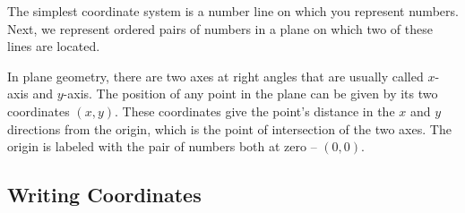 The simplest coordinate system is a number line on which you represent numbers.
Next, we represent ordered pairs of numbers in a plane on which two of these
lines are located.

In plane geometry, there are two axes at right angles that are usually called
$x$-axis and $y$-axis. The position of any point in the plane can be given by
its two coordinates $(x, y)$. These coordinates give the point's distance in
the $x$ and $y$ directions from the origin, which is the point of intersection
of the two axes. The origin is labeled with the pair of numbers both at zero --
$(0, 0)$.

\subsection{Writing Coordinates}
\label{sub_sec:writing_coordinates}






\newpage
